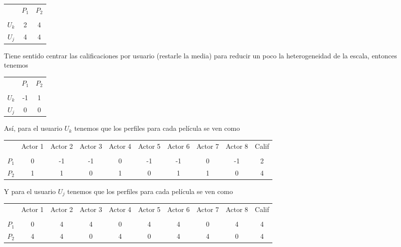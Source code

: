 \begin{center}
\begin{tabular}{ c | c  c }
    & $P_1$ & $P_2$ \\ \\
  \hline                       
$U_k$ & 2 & 4 \\
$U_j$ & 4 & 4 \\
  \hline  
\end{tabular}
\end{center}

Tiene sentido centrar las calificaciones por usuario (restarle la media) para reducir un poco la heterogeneidad de la escala, entonces tenemos

\begin{center}
\begin{tabular}{ c | c  c }
    & $P_1$ & $P_2$ \\ \\
  \hline                       
$U_k$ & -1 & 1 \\
$U_j$ & 0 & 0 \\
  \hline  
\end{tabular}
\end{center}

Así, para el usuario $U_k$ tenemos que los perfiles para cada película se ven como

\begin{center}
\begin{tabular}{ c | c  c c c c c c c c}
    & Actor 1 & Actor 2 & Actor 3 & Actor 4 & Actor 5 & Actor 6 & Actor 7 & Actor 8 & Calif \\ \\
  \hline                       
$P_1$ & 0 & -1 & -1 & 0 & -1 & -1 & 0 & -1 & 2 \\
$P_2$ & 1 & 1 & 0 & 1 & 0 & 1 & 1 & 0 & 4 \\
  \hline  
\end{tabular}
\end{center}

Y para el usuario $U_j$ tenemos que los perfiles para cada película se ven como

\begin{center}
\begin{tabular}{ c | c  c c c c c c c c}
    & Actor 1 & Actor 2 & Actor 3 & Actor 4 & Actor 5 & Actor 6 & Actor 7 & Actor 8 & Calif \\ \\
  \hline                       
$P_1$ & 0 & 4 & 4 & 0 & 4 & 4 & 0 & 4 & 4 \\
$P_2$ & 4 & 4 & 0 & 4 & 0 & 4 & 4 & 0 & 4 \\
  \hline  
\end{tabular}
\end{center}

